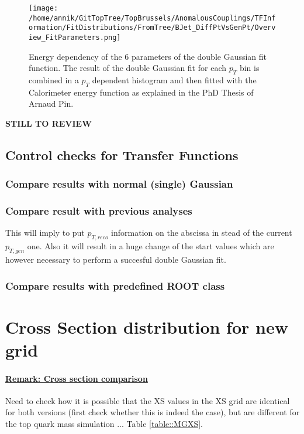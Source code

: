 \begin{figure}[!h]
  \centering
  \texttt{[image: /home/annik/GitTopTree/TopBrussels/AnomalousCouplings/TFInformation/FitDistributions/FromTree/BJet\_DiffPtVsGenPt/Overview\_FitParameters.png]}
  \caption{Energy dependency of the 6 parameters of the double Gaussian fit function. The result of the double Gaussian fit for each $p_T$ bin is combined in a $p_T$ dependent histogram and then fitted with the Calorimeter energy function as explained in the PhD Thesis of Arnaud Pin.} \label{fig::FitParamsBJetPt}
\end{figure}

\newpage
\textbf{STILL TO REVIEW}
\newpage
\subsection{Control checks for Transfer Functions}

\subsubsection{Compare results with normal (single) Gaussian}

\subsubsection{Compare result with previous analyses}
This will imply to put $p_{T,reco}$ information on the abscissa in stead of the current $p_{T,gen}$ one. Also it will result in a huge change of the start values which are however necessary to perform a succesful double Gaussian fit.

\subsubsection{Compare results with predefined ROOT class}

\newpage
\section{Cross Section distribution for new grid}
\paragraph{\underline{Remark: Cross section comparison}\\}
Need to check how it is possible that the XS values in the XS grid are identical for both versions (first check whether this is indeed the case), but are different for the top quark mass simulation ... Table \ref{table::MGXS}.

